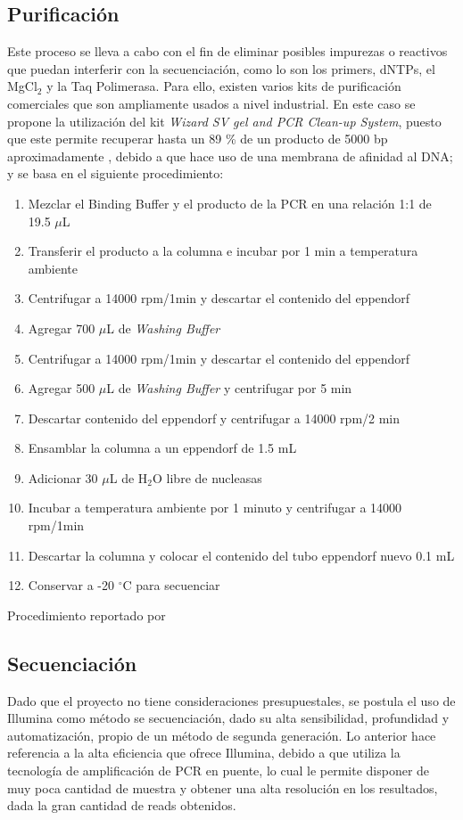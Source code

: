 \documentclass[12pt]{article}
\begin{document}
		\subsection{Purificaci\'on}
			Este proceso se lleva a cabo con el fin de eliminar posibles impurezas o reactivos que puedan interferir con la secuenciación, como lo son los primers, dNTPs, el MgCl$_2$ y la Taq Polimerasa. Para ello, existen varios kits de purificación comerciales que son ampliamente usados a nivel industrial. En este caso se propone la utilización del kit \textit{Wizard SV gel and PCR Clean-up System}, puesto que este permite recuperar hasta un 89 \% de un producto de 5000 bp aproximadamente \cite{kitBook}, debido a que hace uso de una membrana de afinidad al DNA; y se basa en el siguiente procedimiento:
			\begin{enumerate}
				\item Mezclar el Binding Buffer y el producto de la PCR en una relación 1:1 de 19.5 $\mu$L
				\item Transferir el producto a la columna e incubar por 1 min a temperatura ambiente
				\item Centrifugar a 14000 rpm/1min y descartar el contenido del eppendorf 
				\item Agregar 700 $\mu$L de \textit{Washing Buffer}
				\item Centrifugar a 14000 rpm/1min y descartar el contenido del eppendorf 
				\item Agregar 500 $\mu$L de \textit{Washing Buffer} y centrifugar por 5 min 
				\item Descartar contenido del eppendorf y centrifugar a 14000 rpm/2 min 
				\item Ensamblar la columna a un eppendorf de 1.5 mL
				\item Adicionar 30 $\mu$L de H$_2$O libre de nucleasas
				\item Incubar a temperatura ambiente por 1 minuto y centrifugar a 14000 rpm/1min 
				\item Descartar la columna y colocar el contenido del tubo eppendorf nuevo 0.1 mL
				\item Conservar a -20 $^\circ$C para secuenciar
			\end{enumerate}
			\begin{flushright}
				Procedimiento reportado por \citeauthor{kitBook}
			\end{flushright}
			
		\subsection{Secuenciaci\'on}
			Dado que el proyecto no tiene consideraciones presupuestales, se postula el uso de Illumina como método se secuenciaci\'on, dado su alta sensibilidad, profundidad y automatización, propio de un método de segunda generación. Lo anterior hace referencia a la alta eficiencia que ofrece Illumina, debido a que utiliza la tecnología de amplificación de PCR en puente, lo cual le permite disponer de muy poca cantidad de muestra y obtener una alta resolución en los resultados, dada la gran cantidad de reads obtenidos. 
			
\end{document}

